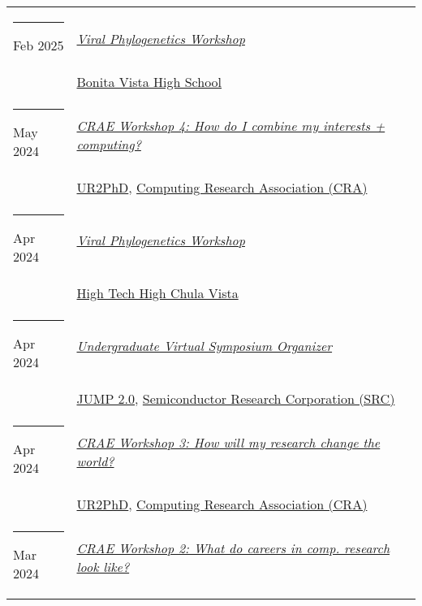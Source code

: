 \documentclass[margin,line]{res}
\begin{document}
\begin{resume}
\begin{longtable}{@{}p{0.7in}p{4in}}
\hspace*{-4mm} \rule{-1mm}{5mm} Feb 2025 & \href{https://bvh.sweetwaterschools.org/}{\textit{Viral Phylogenetics Workshop}}\\*
\hspace*{-4mm} & \hspace{4mm} \href{https://bvh.sweetwaterschools.org/}{Bonita Vista High School}\\
\hspace*{-4mm} \rule{-1mm}{5mm} May 2024 & \href{https://cra.org/ur2phd/#undergraduate-students}{\textit{CRAE Workshop 4: How do I combine my interests + computing?}}\\*
\hspace*{-4mm} & \hspace{4mm} \href{https://cra.org/ur2phd}{UR2PhD}, \href{https://cra.org/}{Computing Research Association (CRA)}\\
\hspace*{-4mm} \rule{-1mm}{5mm} Apr 2024 & \href{https://www.hightechhigh.org/hthcv/}{\textit{Viral Phylogenetics Workshop}}\\*
\hspace*{-4mm} & \hspace{4mm} \href{https://www.hightechhigh.org/hthcv/}{High Tech High Chula Vista}\\
\hspace*{-4mm} \rule{-1mm}{5mm} Apr 2024 & \href{https://cra.org/ur2phd/#undergraduate-students}{\textit{Undergraduate Virtual Symposium Organizer}}\\*
\hspace*{-4mm} & \hspace{4mm} \href{https://www.src.org/program/jump2/}{JUMP 2.0}, \href{https://www.src.org/}{Semiconductor Research Corporation (SRC)}\\
\hspace*{-4mm} \rule{-1mm}{5mm} Apr 2024 & \href{https://cra.org/ur2phd/#undergraduate-students}{\textit{CRAE Workshop 3: How will my research change the world?}}\\*
\hspace*{-4mm} & \hspace{4mm} \href{https://cra.org/ur2phd}{UR2PhD}, \href{https://cra.org/}{Computing Research Association (CRA)}\\
\hspace*{-4mm} \rule{-1mm}{5mm} Mar 2024 & \href{https://cra.org/ur2phd/#undergraduate-students}{\textit{CRAE Workshop 2: What do careers in comp. research look like?}}\\*

\end{longtable}
\end{resume}
\end{document}
